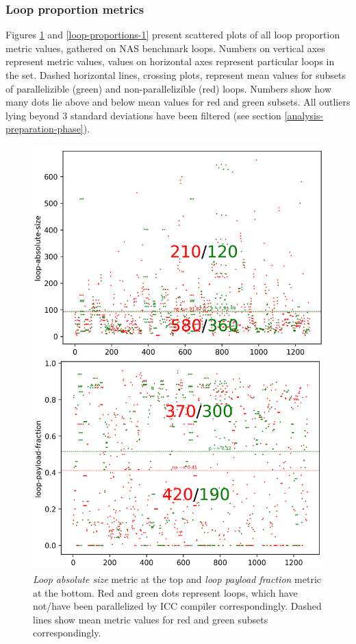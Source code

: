 \subsubsection{Loop proportion metrics}
\label{analysis-loop-proportion-metrics}
\qquad Figures \ref{loop-proportions-0} and \ref{loop-proportions-1} present scattered plots of all loop proportion metric values, gathered on NAS benchmark loops. Numbers on vertical axes represent metric values, values on horizontal axes represent particular loops in the set. Dashed horizontal lines, crossing plots, represent mean values for subsets of parallelizible (green) and non-parallelizible (red) loops. Numbers show how many dots lie above and below mean values for red and green subsets. All outliers lying beyond 3 standard deviations have been filtered (see section \ref{analysis-preparation-phase}).
\begin{figure}[H]
\centering
\includegraphics[width=\linewidth]{figs/loop-proportions-0.png}
\caption{\textit{Loop absolute size} metric at the top and \textit{loop payload fraction} metric at the bottom. Red and green dots represent loops, which have not/have been parallelized by ICC compiler correspondingly. Dashed lines show mean metric values for red and green subsets correspondingly.}
\label{loop-proportions-0}
\end{figure}

